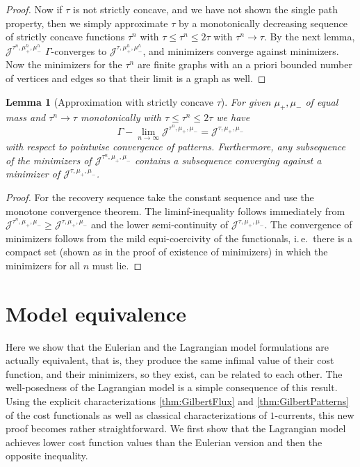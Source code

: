 \documentclass[10pt,a4paper,oneside,final]{article}
\newcommand{\JEn}{{\mathcal{J}}}
\numberwithin{equation}{section}
\theoremstyle{plain}
\newtheorem{lemma}[theorem]{Lemma}
\theoremstyle{definition}
\theoremstyle{remark}
\newcommand{\notinclude}[1]{}
\begin{document}
{\begin{proof}
Now if $\tau$ is not strictly concave, and we have not shown the single path property, then we simply approximate $\tau$ by a monotonically decreasing sequence of strictly concave functions $\tau^n$ with $\tau\leq\tau^n\leq2\tau$ with $\tau^n\to\tau$.
By the next lemma, $\JEn^{\tau^n,\mu_+^h,\mu_-^h}$ $\Gamma$-converges to $\JEn^{\tau,\mu_+^h,\mu_-^h}$, and minimizers converge against minimizers.
Now the minimizers for the $\tau^n$ are finite graphs with an a priori bounded number of vertices and edges so that their limit is a graph as well.
\end{proof}

\begin{lemma}[Approximation with strictly concave $\tau$]
For given $\mu_+,\mu_-$ of equal mass and $\tau^n\to\tau$ monotonically with $\tau\leq\tau^n\leq2\tau$ we have
$$\Gamma-\lim_{n\to\infty}\JEn^{\tau^n,\mu_+,\mu_-}=\JEn^{\tau,\mu_+,\mu_-}$$
with respect to pointwise convergence of patterns.
Furthermore, any subsequence of the minimizers of $\JEn^{\tau^n,\mu_+,\mu_-}$ contains a subsequence converging against a minimizer of $\JEn^{\tau,\mu_+,\mu_-}$.
\end{lemma}
\begin{proof}
For the recovery sequence take the constant sequence and use the monotone convergence theorem.
The liminf-inequality follows immediately from $\JEn^{\tau^n,\mu_+,\mu_-}\geq\JEn^{\tau,\mu_+,\mu_-}$ and the lower semi-continuity of $\JEn^{\tau,\mu_+,\mu_-}$.
The convergence of minimizers follows from the mild equi-coercivity of the functionals, i.\,e.\ there is a compact set (shown as in the proof of existence of minimizers) in which the minimizers for all $n$ must lie.
\end{proof}
}%

\section{Model equivalence}\label{sec:equivalence}

Here we show that the Eulerian and the Lagrangian model formulations are actually equivalent,
that is, they produce the same infimal value of their cost function, and their minimizers, so they exist, can be related to each other.
The well-posedness of the Lagrangian model is a simple consequence of this result.
Using the explicit characterizations \cref{thm:GilbertFlux} and \cref{thm:GilbertPatterns} of the cost functionals as well as classical characterizations of $1$-currents,
this new proof becomes rather straightforward.
We first show that the Lagrangian model achieves lower cost function values than the Eulerian version and then the opposite inequality.
\end{document}
